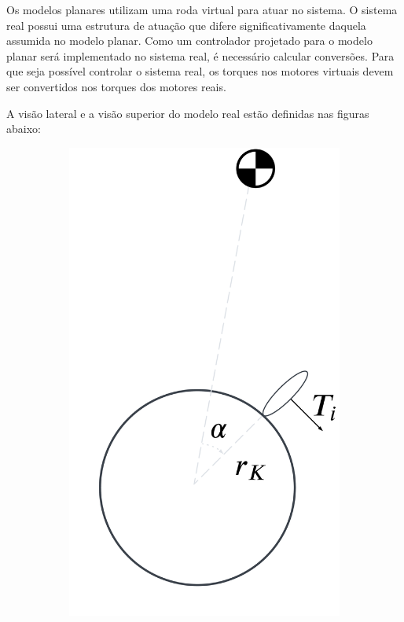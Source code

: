 Os modelos planares utilizam uma roda virtual para atuar no sistema. O sistema real possui uma estrutura de atuação que difere significativamente daquela assumida no modelo planar. Como um controlador projetado para o modelo planar será implementado no sistema real, é necessário calcular conversões. Para que seja possível controlar o sistema real, os torques nos motores virtuais devem ser convertidos nos torques dos motores reais.

A visão lateral e a visão superior do modelo real estão definidas nas figuras abaixo:

\begin{figure}[H]
    \centering
    \begin{subfigure}[b]{0.4\textwidth}
        \centering
        \includegraphics[width=\linewidth]{Metodologia/Figuras/torque_side.png}

\end{subfigure}
\end{figure}
